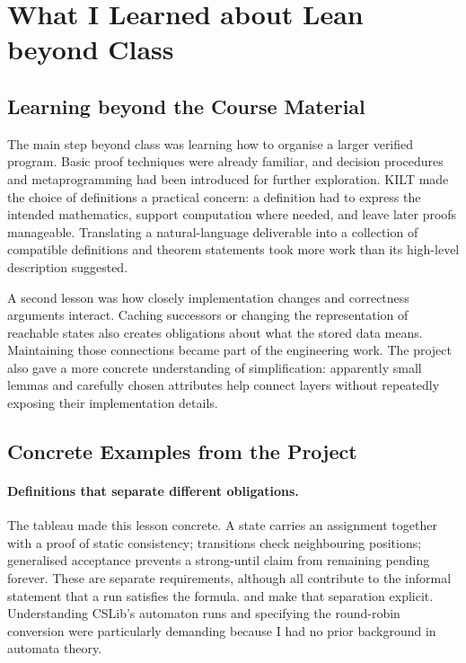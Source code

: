 \section{What I Learned about Lean beyond Class}\label{sec:learning}

\subsection{Learning beyond the Course Material}

The main step beyond class was learning how to organise a larger verified
program. Basic proof techniques were already familiar, and decision procedures
and metaprogramming had been introduced for further exploration. KILT made
the choice of definitions a practical concern: a definition had to express
the intended mathematics, support computation where needed, and leave later
proofs manageable. Translating a natural-language deliverable into a collection
of compatible definitions and theorem statements took more work than its
high-level description suggested.

A second lesson was how closely implementation changes and correctness
arguments interact. Caching successors or changing the representation of
reachable states also creates obligations about what the stored data means.
Maintaining those connections became part of the engineering work. The
project also gave a more concrete understanding of simplification: apparently
small lemmas and carefully chosen  attributes help connect layers
without repeatedly exposing their implementation details.

\subsection{Concrete Examples from the Project}

\paragraph{Definitions that separate different obligations.}
The tableau made this lesson concrete. A state carries an assignment together
with a proof of static consistency; transitions check neighbouring positions;
generalised acceptance prevents a strong-until claim from remaining pending
forever. These are separate requirements, although all contribute to the
informal statement that a run satisfies the formula.
 and 
make that separation explicit. Understanding CSLib's automaton runs and
specifying the round-robin conversion were particularly demanding because
I had no prior background in automata theory.

